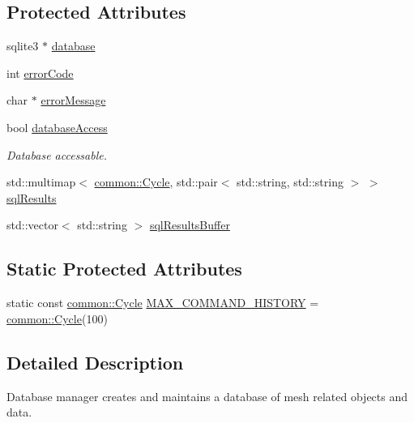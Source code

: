 \subsection*{\-Protected \-Attributes}
\begin{DoxyCompactItemize}
\item 
sqlite3 $\ast$ \hyperlink{classcryomesh_1_1manager_1_1DatabaseManager_afa0d9b3d19f26e04dc14e5cbb018cddc}{database}
\item 
int \hyperlink{classcryomesh_1_1manager_1_1DatabaseManager_a05a135d69a6712413acd15427ce7e630}{error\-Code}
\item 
char $\ast$ \hyperlink{classcryomesh_1_1manager_1_1DatabaseManager_a090927bf06bda68c2f19f6c91997e606}{error\-Message}
\item 
bool \hyperlink{classcryomesh_1_1manager_1_1DatabaseManager_ac09173fec7302858a6c0e4ac2d0f5b5d}{database\-Access}
\begin{DoxyCompactList}\small\item\em \-Database accessable. \end{DoxyCompactList}\item 
std\-::multimap$<$ \hyperlink{classcryomesh_1_1common_1_1Cycle}{common\-::\-Cycle}, \*
std\-::pair$<$ std\-::string, \*
std\-::string $>$ $>$ \hyperlink{classcryomesh_1_1manager_1_1DatabaseManager_a1f492cb29428437d917edf1e5b085825}{sql\-Results}
\item 
std\-::vector$<$ std\-::string $>$ \hyperlink{classcryomesh_1_1manager_1_1DatabaseManager_aae9b0bfc988f6cab5dc3b0f931c7214c}{sql\-Results\-Buffer}
\end{DoxyCompactItemize}
\subsection*{\-Static \-Protected \-Attributes}
\begin{DoxyCompactItemize}
\item 
static const \hyperlink{classcryomesh_1_1common_1_1Cycle}{common\-::\-Cycle} \hyperlink{classcryomesh_1_1manager_1_1DatabaseManager_aa982e5617f8180e3a3cc848f860d69de}{\-M\-A\-X\-\_\-\-C\-O\-M\-M\-A\-N\-D\-\_\-\-H\-I\-S\-T\-O\-R\-Y} = \hyperlink{classcryomesh_1_1common_1_1Cycle}{common\-::\-Cycle}(100)
\end{DoxyCompactItemize}


\subsection{\-Detailed \-Description}
\-Database manager creates and maintains a database of mesh related objects and data. 

